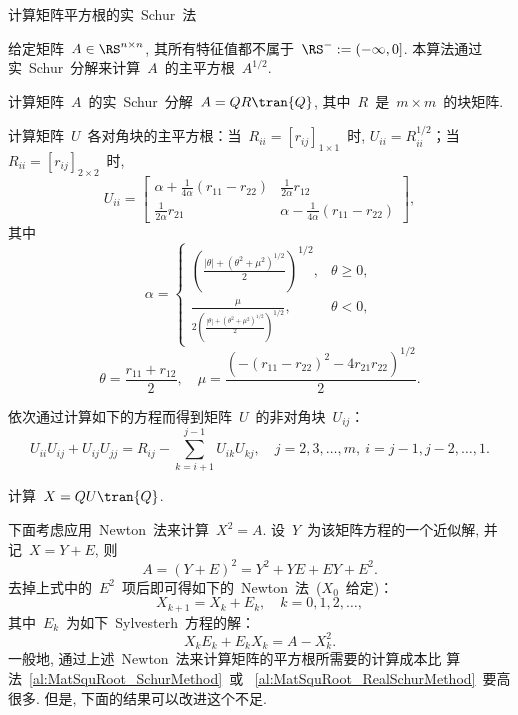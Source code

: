 \begin{algorithm}[h!]
\caption{计算矩阵平方根的实~Schur~法~\cite{Higham1987}}
\label{al:MatSquRoot_RealSchurMethod} 给定矩阵~$A\in\RS^{n\times
n}$, 其所有特征值都不属于~$\RS^- := (-\infty,0]$.
本算法通过实~Schur~分解来计算~$A$~的主平方根~$A^{1/2}$.
\begin{list}{.}{
\setlength{\rightmargin}{0em}\setlength{\leftmargin}{1.2em}}
\item
计算矩阵~$A$~的实~Schur~分解~$A = QR\tran{Q}$, 其中~$R$~是~$m\times
m$~的块矩阵.
\item
计算矩阵~$U$~各对角块的主平方根：当~$R_{ii}=[r_{ij}]_{1\times1}$~时,
$U_{ii} = R_{ii}^{1/2}$；当~$R_{ii}=[r_{ij}]_{2\times2}$~时,
$$
U_{ii} = \left[\begin{array}{cc} \alpha +
\displaystyle\frac{1}{4\alpha}(r_{11}-r_{22}) &
\displaystyle\frac{1}{2\alpha}r_{12} \\
\displaystyle\frac{1}{2\alpha}r_{21} & \alpha -
\displaystyle\frac{1}{4\alpha}(r_{11}-r_{22})
\end{array}\right],
$$
其中
\begin{equation*}
\alpha = \left\{
\begin{array}{ll}
\displaystyle \left(\frac{|\theta|+(\theta^2 +
\mu^2)^{1/2}}{2}\right)^{1/2}, & \theta \geq 0,\\
\displaystyle
\frac{\mu}{2\left(\displaystyle\frac{|\theta|+(\theta^2 +
\mu^2)^{1/2}}{2}\right)^{1/2}}, & \theta <0,
\end{array}
\right.
\end{equation*}
$$
\theta = \frac{r_{11}+r_{12}}{2},\quad \mu =
\frac{\left(-(r_{11}-r_{22})^2-4r_{21}r_{22}\right)^{1/2}}{2}.
$$
\item
依次通过计算如下的方程而得到矩阵~$U$~的非对角块~$U_{ij}$：
$$
U_{ii}U_{ij} + U_{ij}U_{jj} = R_{ij} - \sum_{k=i+1}^{j-1}
U_{ik}U_{kj}, \quad j = 2,3,\ldots,m,\ i = j-1,j-2,\ldots,1.
$$
\item
计算~$X = QU\tran{Q}$.
\end{list}
\end{algorithm}



下面考虑应用~Newton~法来计算~$X^2=A$.
设~$Y$~为该矩阵方程的一个近似解, 并记~$X = Y+E$, 则
$$
A = (Y+E)^2 = Y^2 + YE + EY + E^2.
$$
去掉上式中的~$E^2$~项后即可得如下的~Newton~法~($X_0$~给定)：
\begin{equation}
\label{it:NM_MatSquRoot_original} X_{k+1} = X_k + E_k, \quad k = 0,
1, 2, \ldots,
\end{equation}
其中~$E_k$~为如下~Sylvesterh~方程的解：
$$
X_k E_k + E_k X_k = A - X^2_k.
$$
一般地, 通过上述~Newton~法来计算矩阵的平方根所需要的计算成本比
算法~\ref{al:MatSquRoot_SchurMethod}~或
~\ref{al:MatSquRoot_RealSchurMethod}~要高很多. 但是,
下面的结果可以改进这个不足.

